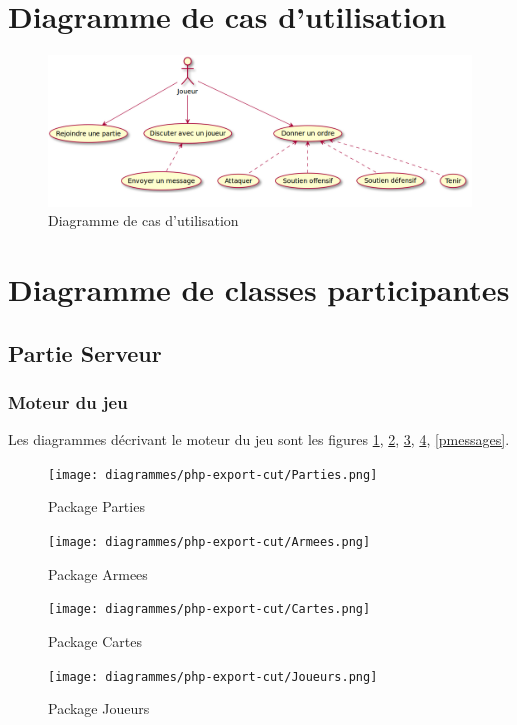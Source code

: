 \section{Diagramme de cas d'utilisation}
	\begin{figure}[H]
		\centering
		\includegraphics[scale=0.4]{images/UseCase.png}
		\caption{Diagramme de cas d'utilisation}
	\end{figure}


\section{Diagramme de classes participantes}
	\subsection{Partie Serveur}
		\subsubsection{Moteur du jeu}
        Les diagrammes décrivant le moteur du jeu sont les figures \ref{pparties}, \ref{parmees}, \ref{pcartes}, \ref{pjoueurs}, \ref{pmessages}.
			\begin{figure}[H]
				\centering
                \texttt{[image: diagrammes/php-export-cut/Parties.png]}
                \caption{\label{pparties}Package Parties}
			\end{figure}

			\begin{figure}[H]
				\centering
                \texttt{[image: diagrammes/php-export-cut/Armees.png]}
                \caption{\label{parmees}Package Armees}
			\end{figure}

			\begin{figure}[H]
				\centering
                \texttt{[image: diagrammes/php-export-cut/Cartes.png]}
                \caption{\label{pcartes}Package Cartes}
			\end{figure}

			\begin{figure}[H]
				\centering
                \texttt{[image: diagrammes/php-export-cut/Joueurs.png]}
                \caption{\label{pjoueurs}Package Joueurs}
			\end{figure}


